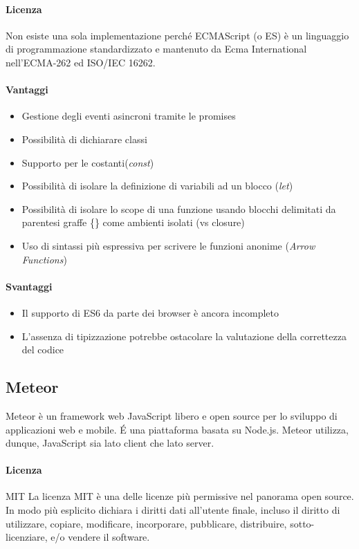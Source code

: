 \paragraph{Licenza}  
Non esiste una sola implementazione perché ECMAScript (o ES) è un
linguaggio di programmazione standardizzato e mantenuto da Ecma
International nell'ECMA-262 ed ISO/IEC 16262. \\


\paragraph{Vantaggi}
\begin{itemize}
	\item Gestione degli eventi asincroni tramite le promises
	\item Possibilità di dichiarare classi
	\item Supporto per le costanti(\emph{const})
	\item Possibilità di isolare la definizione di variabili ad un blocco (\emph{let})
	\item Possibilità di isolare lo scope di una funzione usando
     blocchi delimitati da parentesi graffe \{\} come ambienti isolati (vs closure)
	\item Uso di sintassi più espressiva per scrivere le funzioni anonime (\emph{Arrow Functions})
	
\end{itemize}

\paragraph{Svantaggi} 
\begin{itemize}
	\item Il supporto di ES6 da parte dei browser è ancora incompleto
	\item L’assenza di tipizzazione potrebbe ostacolare la valutazione della correttezza del codice
\end{itemize}

\subsection{Meteor}

Meteor è un framework web JavaScript libero e open source  per lo
sviluppo di applicazioni web e mobile. \'E una piattaforma basata su
Node.js. Meteor utilizza, dunque, JavaScript sia lato client che lato
server.  
\\
\paragraph{Licenza} MIT 
La licenza MIT è una delle licenze più permissive nel panorama open
source. In modo più esplicito dichiara i diritti dati all'utente
finale, incluso il diritto di utilizzare, copiare, modificare,
incorporare, pubblicare, distribuire, sotto-licenziare, e/o vendere il
software. 


